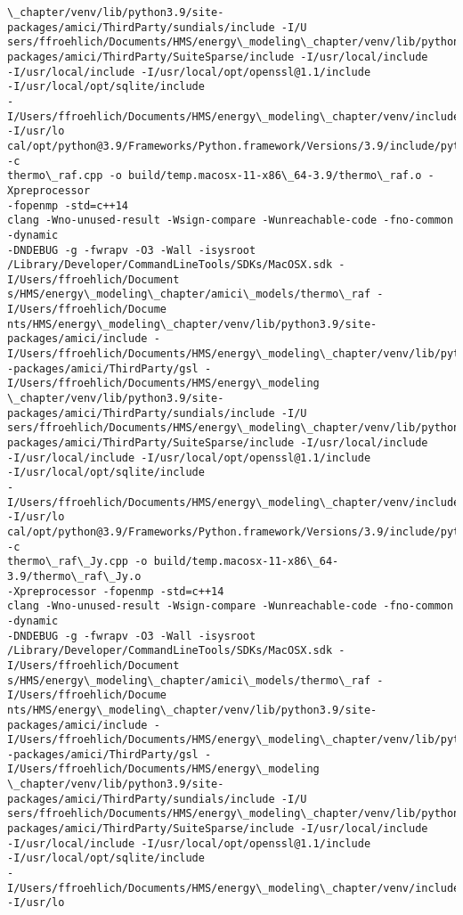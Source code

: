 \documentclass[11pt]{article}
\begin{document}
\begin{Verbatim}[commandchars=\\\{\}]
\_chapter/venv/lib/python3.9/site-packages/amici/ThirdParty/sundials/include -I/U
sers/ffroehlich/Documents/HMS/energy\_modeling\_chapter/venv/lib/python3.9/site-
packages/amici/ThirdParty/SuiteSparse/include -I/usr/local/include
-I/usr/local/include -I/usr/local/opt/openssl@1.1/include
-I/usr/local/opt/sqlite/include
-I/Users/ffroehlich/Documents/HMS/energy\_modeling\_chapter/venv/include -I/usr/lo
cal/opt/python@3.9/Frameworks/Python.framework/Versions/3.9/include/python3.9 -c
thermo\_raf.cpp -o build/temp.macosx-11-x86\_64-3.9/thermo\_raf.o -Xpreprocessor
-fopenmp -std=c++14
clang -Wno-unused-result -Wsign-compare -Wunreachable-code -fno-common -dynamic
-DNDEBUG -g -fwrapv -O3 -Wall -isysroot
/Library/Developer/CommandLineTools/SDKs/MacOSX.sdk -I/Users/ffroehlich/Document
s/HMS/energy\_modeling\_chapter/amici\_models/thermo\_raf -I/Users/ffroehlich/Docume
nts/HMS/energy\_modeling\_chapter/venv/lib/python3.9/site-packages/amici/include -
I/Users/ffroehlich/Documents/HMS/energy\_modeling\_chapter/venv/lib/python3.9/site
-packages/amici/ThirdParty/gsl -I/Users/ffroehlich/Documents/HMS/energy\_modeling
\_chapter/venv/lib/python3.9/site-packages/amici/ThirdParty/sundials/include -I/U
sers/ffroehlich/Documents/HMS/energy\_modeling\_chapter/venv/lib/python3.9/site-
packages/amici/ThirdParty/SuiteSparse/include -I/usr/local/include
-I/usr/local/include -I/usr/local/opt/openssl@1.1/include
-I/usr/local/opt/sqlite/include
-I/Users/ffroehlich/Documents/HMS/energy\_modeling\_chapter/venv/include -I/usr/lo
cal/opt/python@3.9/Frameworks/Python.framework/Versions/3.9/include/python3.9 -c
thermo\_raf\_Jy.cpp -o build/temp.macosx-11-x86\_64-3.9/thermo\_raf\_Jy.o
-Xpreprocessor -fopenmp -std=c++14
clang -Wno-unused-result -Wsign-compare -Wunreachable-code -fno-common -dynamic
-DNDEBUG -g -fwrapv -O3 -Wall -isysroot
/Library/Developer/CommandLineTools/SDKs/MacOSX.sdk -I/Users/ffroehlich/Document
s/HMS/energy\_modeling\_chapter/amici\_models/thermo\_raf -I/Users/ffroehlich/Docume
nts/HMS/energy\_modeling\_chapter/venv/lib/python3.9/site-packages/amici/include -
I/Users/ffroehlich/Documents/HMS/energy\_modeling\_chapter/venv/lib/python3.9/site
-packages/amici/ThirdParty/gsl -I/Users/ffroehlich/Documents/HMS/energy\_modeling
\_chapter/venv/lib/python3.9/site-packages/amici/ThirdParty/sundials/include -I/U
sers/ffroehlich/Documents/HMS/energy\_modeling\_chapter/venv/lib/python3.9/site-
packages/amici/ThirdParty/SuiteSparse/include -I/usr/local/include
-I/usr/local/include -I/usr/local/opt/openssl@1.1/include
-I/usr/local/opt/sqlite/include
-I/Users/ffroehlich/Documents/HMS/energy\_modeling\_chapter/venv/include -I/usr/lo

\end{Verbatim}
\end{document}

